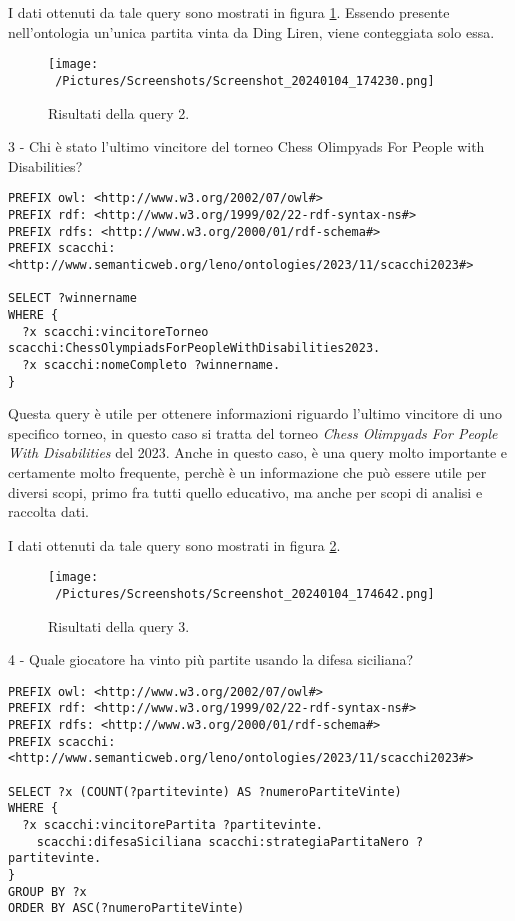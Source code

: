 \documentclass[12pt]{book}
\begin{document}
I dati ottenuti da tale query sono mostrati in figura \ref{fig:query2}.
Essendo presente nell'ontologia un'unica partita vinta da Ding Liren,
viene conteggiata solo essa.

\begin{figure}[h]
  \caption{Risultati della query 2.}
  \centering
  \label{fig:query2}
  \texttt{[image: ~/Pictures/Screenshots/Screenshot\_20240104\_174230.png]}
\end{figure} 

3 - Chi è stato l'ultimo vincitore del torneo Chess Olimpyads For
People with Disabilities?

\begin{verbatim}
PREFIX owl: <http://www.w3.org/2002/07/owl#>
PREFIX rdf: <http://www.w3.org/1999/02/22-rdf-syntax-ns#>
PREFIX rdfs: <http://www.w3.org/2000/01/rdf-schema#>
PREFIX scacchi: <http://www.semanticweb.org/leno/ontologies/2023/11/scacchi2023#>

SELECT ?winnername
WHERE {
  ?x scacchi:vincitoreTorneo scacchi:ChessOlympiadsForPeopleWithDisabilities2023.
  ?x scacchi:nomeCompleto ?winnername.
}
\end{verbatim}

Questa query è utile per ottenere informazioni riguardo l'ultimo
vincitore di uno specifico torneo, in questo caso si tratta del torneo
\textit{Chess Olimpyads For People With Disabilities} del 2023. Anche
in questo caso, è una query molto importante e certamente molto
frequente, perchè è un informazione che può essere utile per diversi
scopi, primo fra tutti quello educativo, ma anche per scopi di analisi
e raccolta dati.

I dati ottenuti da tale query sono mostrati in figura \ref{fig:query3}.

\begin{figure}[h]
  \caption{Risultati della query 3.}
  \centering
  \label{fig:query3}
  \texttt{[image: ~/Pictures/Screenshots/Screenshot\_20240104\_174642.png]}
\end{figure} 

4 - Quale giocatore ha vinto più partite usando la difesa siciliana?

\begin{verbatim}
PREFIX owl: <http://www.w3.org/2002/07/owl#>
PREFIX rdf: <http://www.w3.org/1999/02/22-rdf-syntax-ns#>
PREFIX rdfs: <http://www.w3.org/2000/01/rdf-schema#>
PREFIX scacchi: <http://www.semanticweb.org/leno/ontologies/2023/11/scacchi2023#>

SELECT ?x (COUNT(?partitevinte) AS ?numeroPartiteVinte)
WHERE {
  ?x scacchi:vincitorePartita ?partitevinte.
    scacchi:difesaSiciliana scacchi:strategiaPartitaNero ?partitevinte.
}
GROUP BY ?x
ORDER BY ASC(?numeroPartiteVinte)
\end{verbatim}
\end{document}
